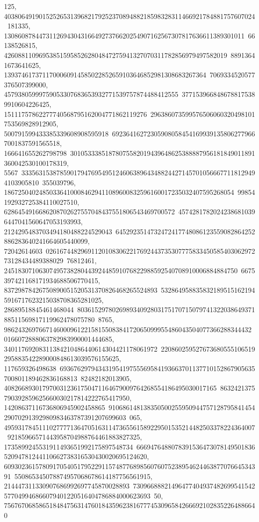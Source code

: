{{{125, 403806491901525265313968217925237089488218598328311466921784881757607024\
181335, 130860878447311269430431664927376620254907162567307817636611389301011\
66138526815, 4260881109695385159585262804847275941327070311782856979497582019\
88913641673641625, 1393746173711700060914585022852659103646852981308683267364\
7069334520577376507399000, 45793805999759053307683653932771539757874488412555\
3771539668486788175389910604226425, 15111757862277740568795162004771862119276\
296386073599576506060320498101753569828912905, 500791599433385339608908595918\
692364162723059080584541699391358062779667001837591565518, 166641655262798798\
30105333851878075582019439648625388887956181849011891360042530100178319, 5567\
33356315387859017947695495124606389643488244271457010566677118129494103905810\
355039796, 186725040248503364100084629411089600832596160017235032407595268054\
99854192932725384110027510, 6286454916686208702627557048437551806543469700572\
45742817820242386810396447041560647053193993, 2124295483703494180488224529043\
6452923514732472417748086123559082864252886283640241664605440099, 72042614603\
02616744829691120108306221769244373530777583345058540306297273128434489388029\
76812461, 2451830710630749573828044392448591076822988592540708910006884884750\
6675397421168171934688506770415, 83729878426750890051520531370826468265524893\
5328649588358321895151621945916717623215038708365281025, 28689518845461468044\
80361529780269893409280317517071507974132203864937188511569817119962478075780\
8765, 98624326976671460009612215815508384172065099955486043504077366288344432\
0166072888063782983990001444685, 34011769208311384210486440614304421178061972\
220860259527673680555106519295883542289000848613039576155625, 117659326498638\
69367629794343195419755569584193663701137710152867905635700801189462836168813\
82482182013905, 4082668930179700312361750471164679009764268554186495030017165\
8632421375790392859625660030217814222765417950, 14208637116736806945902458865\
91068614813835050025595094475712879584145429070291392980983463787391207699603\
065, 495931784511102777713647051631147365561589229501535214482503378224364007\
92185966571443958704988764461883827325, 1735899245531911493651992175897548734\
666947648807839153647307814950183652094781244110662738316530430020695124620, 
   60930236157809170540517952291157487768985607607523895462446387707664534391\
550865345078874957068678614187756561915, 214447311330907686992697745870028893\
73096688821496477404937482699541542577049946866079401220516404786884000623693\
50, 7567670685865184847563147601843596238167774530965842666921028352264886640\
}}}
